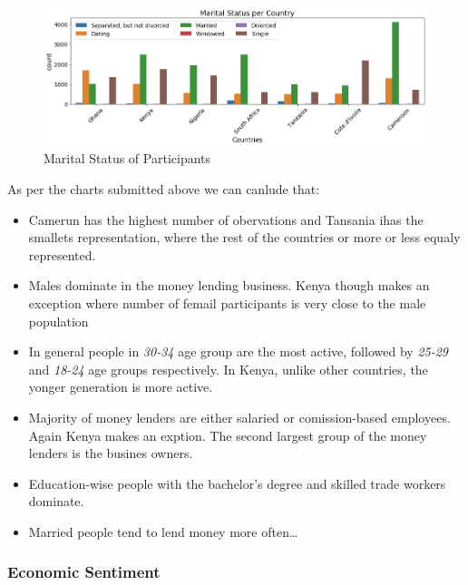 \begin{Schunk}
\begin{figure}[H]

{\centering \includegraphics[width=1.15\linewidth]{../../artifacts/participant_marital} 

}

\caption[Marital Status of Participants]{Marital Status of Participants}\label{fig:pms}
\end{figure}
\end{Schunk}

As per the charts submitted above we can canlude that:

\begin{itemize}
\tightlist
\item
  Camerun has the highest number of obervations and Tansania ihas the
  smallets representation, where the rest of the countries or more or
  less equaly represented.
\item
  Males dominate in the money lending business. Kenya though makes an
  exception where number of femail participants is very close to the
  male population
\item
  In general people in \emph{30-34} age group are the most active,
  followed by \emph{25-29} and \emph{18-24} age groups respectively. In
  Kenya, unlike other countries, the yonger generation is more active.
\item
  Majority of money lenders are either salaried or comission-based
  employees. Again Kenya makes an exption. The second largest group of
  the money lenders is the busines owners.
\item
  Education-wise people with the bachelor's degree and skilled trade
  workers dominate.
\item
  Married people tend to lend money more often\ldots{}
\end{itemize}

\hypertarget{economic-sentiment}{%
\subsubsection{Economic Sentiment}\label{economic-sentiment}}

